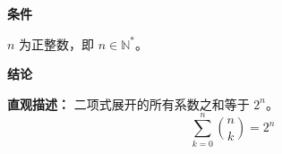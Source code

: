 \begin{statementbox}
	\textbf{\textcolor{CStatement}{条件}}
	\begin{description}[style=nextline, leftmargin=2.8em, labelsep=0.5em, itemsep=0.35em]
		\item[\textbf{\textcolor{CStatement}{条件 1（指数范围）：}}] $n$ 为正整数，即 $n\in\mathbb{N}^*$。
	\end{description}

	\textbf{\textcolor{CStatement}{结论}}
	\begin{description}[style=nextline, leftmargin=2.8em, labelsep=0.5em, itemsep=0.45em]
		\item[\textbf{\textcolor{CStatement}{结论（二项系数和）：}}]
			\textbf{\textcolor{CStatement}{直观描述：}}
			二项式展开的所有系数之和等于 $2^n$。
			\[
				\sum_{k=0}^{n} \binom{n}{k} = 2^n
			\]
	\end{description}
\end{statementbox}
